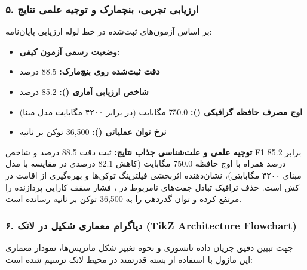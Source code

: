 \subsubsection*{۵. ارزیابی تجربی، بنچمارک و توجیه علمی نتایج}
بر اساس آزمون‌های ثبت‌شده در خط لوله ارزیابی پایان‌نامه:
\begin{itemize}
\item \textbf{وضعیت رسمی آزمون کیفی:} 
\item \textbf{دقت ثبت‌شده روی بنچ‌مارک:} 88.5 درصد
\item \textbf{شاخص ارزیابی آماری ():} 85.2 درصد
\item \textbf{اوج مصرف حافظه گرافیکی ():} 750.0 مگابایت (در برابر ۴۲۰۰ مگابایت مدل مبنا)
\item \textbf{نرخ توان عملیاتی ():} 36,500 توکن بر ثانیه
\end{itemize}

\textbf{توجیه علمی و علت‌شناسی جذاب نتایج:}
ثبت دقت 88.5 درصد و شاخص F1 برابر 85.2 درصد همراه با اوج حافظه 750.0 مگابایت (کاهش 82.1 درصدی در مقایسه با مدل مبنای ۴۲۰۰ مگابایتی)، نشان‌دهنده اثربخشی فیلترینگ توکن‌ها و بهره‌گیری از اقامت در کش  است. حذف ترافیک تبادل جفت‌های نامربوط در ، فشار سقف کارایی پردازنده را مرتفع کرده و توان گذردهی را به 36,500 توکن بر ثانیه رسانده است.



\subsubsection*{۶. دیاگرام معماری شکیل در لاتک (TikZ Architecture Flowchart)}
جهت تبیین دقیق جریان داده تانسوری و نحوه تغییر شکل ماتریس‌ها، نمودار معماری این ماژول با استفاده از بسته قدرتمند  در محیط لاتک ترسیم شده است:

\begin{center}
\end{center}

